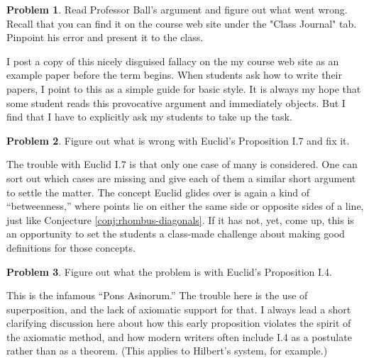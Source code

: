 \documentclass{tufte-handout}
\theoremstyle{definition}
\newtheorem{problem}{Problem}[section]
\begin{document}
\begin{problem}\label{prob:Ball}
Read Professor Ball's argument and figure out what went wrong.
Recall that you can find it on the course web site under the "Class Journal" tab.
Pinpoint his error and present it to the class.
\end{problem}

I post a copy of this nicely disguised fallacy on the my course web site as an example paper before the term begins. When students ask how to write their papers, I point to this as a simple guide for basic style. It is always my hope that some student reads this provocative argument and immediately objects. But I find that I have to explicitly ask my students to take up the task. 

\begin{problem}\label{prob:fix-I.7}
Figure out what is wrong with Euclid's Proposition I.7 and fix it.
\end{problem}

The trouble with Euclid I.7 is that only one case of many is considered. One can sort out which cases are missing and give each of them a similar short argument to settle the matter. The concept Euclid glides over is again a kind of ``betweenness,'' where points lie on either the same side or opposite sides of a line, just like Conjecture \ref{conj:rhombus-diagonals}. If it has not, yet, come up, this is an opportunity to set the students a class-made challenge about making good definitions for those concepts. 

\begin{problem}\label{prob:fix-I.4}
Figure out what the problem is with Euclid's Proposition I.4.
\end{problem}

This is the infamous ``Pons Asinorum.'' The trouble here is the use of superposition, and the lack of axiomatic support for that. I always lead a short clarifying discussion here about how this early proposition violates the spirit of the axiomatic method, and how modern writers often include I.4 as a postulate rather than as a theorem. (This applies to Hilbert's system, for example.)
\end{document}
